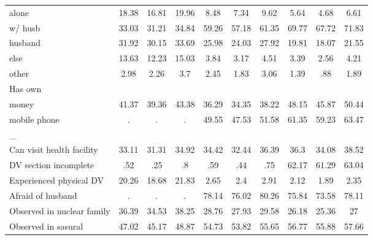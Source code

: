 \begin{tabular}{l*{9}{c}}
alone               &       18.38&       16.81&       19.96&        8.48&        7.34&        9.62&        5.64&        4.68&        6.61\\
w/ husb             &       33.03&       31.21&       34.84&       59.26&       57.18&       61.35&       69.77&       67.72&       71.83\\
husband             &       31.92&       30.15&       33.69&       25.98&       24.03&       27.92&       19.81&       18.07&       21.55\\
else                &       13.63&       12.23&       15.03&        3.84&        3.17&        4.51&        3.39&        2.56&        4.21\\
other               &        2.98&        2.26&         3.7&        2.45&        1.83&        3.06&        1.39&         .88&        1.89\\
\midrule
Has own             &            &            &            &            &            &            &            &            &            \\
money               &       41.37&       39.36&       43.38&       36.29&       34.35&       38.22&       48.15&       45.87&       50.44\\
mobile phone        &           .&           .&           .&       49.55&       47.53&       51.58&       61.35&       59.23&       63.47\\
\midrule
\_                   &            &            &            &            &            &            &            &            &            \\
Can visit health facility&       33.11&       31.31&       34.92&       34.42&       32.44&       36.39&        36.3&       34.08&       38.52\\
DV section incomplete&         .52&         .25&          .8&         .59&         .44&         .75&       62.17&       61.29&       63.04\\
Experienced physical DV&       20.26&       18.68&       21.83&        2.65&         2.4&        2.91&        2.12&        1.89&        2.35\\
Afraid of husband   &           .&           .&           .&       78.14&       76.02&       80.26&       75.84&       73.58&       78.11\\
Observed in nuclear family&       36.39&       34.53&       38.25&       28.76&       27.93&       29.58&       26.18&       25.36&          27\\
Observed in sasural &       47.02&       45.17&       48.87&       54.73&       53.82&       55.65&       56.77&       55.88&       57.66\\

\end{tabular}
